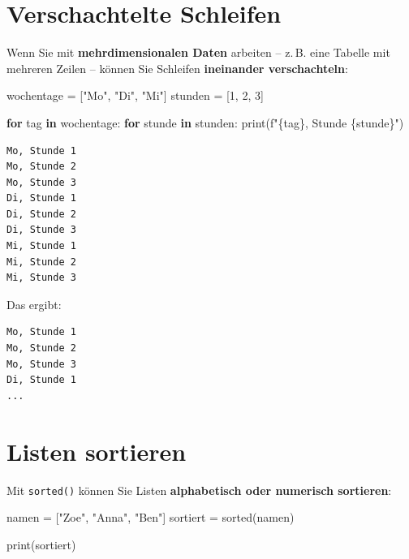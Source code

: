 \documentclass[
  letterpaper,
  DIV=11,
  numbers=noendperiod]{scrreprt}
\newenvironment{Shaded}{\begin{snugshade}}{\end{snugshade}}
\newcommand{\BuiltInTok}[1]{\textcolor[rgb]{0.00,0.23,0.31}{#1}}
\newcommand{\ControlFlowTok}[1]{\textcolor[rgb]{0.00,0.23,0.31}{\textbf{#1}}}
\newcommand{\DecValTok}[1]{\textcolor[rgb]{0.68,0.00,0.00}{#1}}
\newcommand{\KeywordTok}[1]{\textcolor[rgb]{0.00,0.23,0.31}{\textbf{#1}}}
\newcommand{\NormalTok}[1]{\textcolor[rgb]{0.00,0.23,0.31}{#1}}
\newcommand{\OperatorTok}[1]{\textcolor[rgb]{0.37,0.37,0.37}{#1}}
\newcommand{\SpecialCharTok}[1]{\textcolor[rgb]{0.37,0.37,0.37}{#1}}
\newcommand{\SpecialStringTok}[1]{\textcolor[rgb]{0.13,0.47,0.30}{#1}}
\newcommand{\StringTok}[1]{\textcolor[rgb]{0.13,0.47,0.30}{#1}}
\begin{document}
\section{Verschachtelte Schleifen}\label{verschachtelte-schleifen}

Wenn Sie mit \textbf{mehrdimensionalen Daten} arbeiten -- z.\,B. eine
Tabelle mit mehreren Zeilen -- können Sie Schleifen \textbf{ineinander
verschachteln}:

\begin{Shaded}
\begin{Highlighting}[]
\NormalTok{wochentage }\OperatorTok{=}\NormalTok{ [}\StringTok{"Mo"}\NormalTok{, }\StringTok{"Di"}\NormalTok{, }\StringTok{"Mi"}\NormalTok{]}
\NormalTok{stunden }\OperatorTok{=}\NormalTok{ [}\DecValTok{1}\NormalTok{, }\DecValTok{2}\NormalTok{, }\DecValTok{3}\NormalTok{]}

\ControlFlowTok{for}\NormalTok{ tag }\KeywordTok{in}\NormalTok{ wochentage:}
    \ControlFlowTok{for}\NormalTok{ stunde }\KeywordTok{in}\NormalTok{ stunden:}
        \BuiltInTok{print}\NormalTok{(}\SpecialStringTok{f"}\SpecialCharTok{\{}\NormalTok{tag}\SpecialCharTok{\}}\SpecialStringTok{, Stunde }\SpecialCharTok{\{}\NormalTok{stunde}\SpecialCharTok{\}}\SpecialStringTok{"}\NormalTok{)}
\end{Highlighting}
\end{Shaded}

\begin{verbatim}
Mo, Stunde 1
Mo, Stunde 2
Mo, Stunde 3
Di, Stunde 1
Di, Stunde 2
Di, Stunde 3
Mi, Stunde 1
Mi, Stunde 2
Mi, Stunde 3
\end{verbatim}

Das ergibt:

\begin{verbatim}
Mo, Stunde 1
Mo, Stunde 2
Mo, Stunde 3
Di, Stunde 1
...
\end{verbatim}

\section{Listen sortieren}\label{listen-sortieren}

Mit \texttt{sorted()} können Sie Listen \textbf{alphabetisch oder
numerisch sortieren}:

\begin{Shaded}
\begin{Highlighting}[]
\NormalTok{namen }\OperatorTok{=}\NormalTok{ [}\StringTok{"Zoe"}\NormalTok{, }\StringTok{"Anna"}\NormalTok{, }\StringTok{"Ben"}\NormalTok{]}
\NormalTok{sortiert }\OperatorTok{=} \BuiltInTok{sorted}\NormalTok{(namen)}

\BuiltInTok{print}\NormalTok{(sortiert)}
\end{Highlighting}
\end{Shaded}
\end{document}

